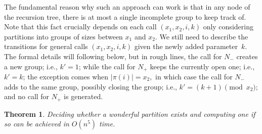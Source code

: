 \documentclass[a4paper]{article}
\newcommand{\modulus}[1]{\vert #1 \vert}
\newtheorem{theorem}{Theorem}\newtheorem{lemma}[theorem]{Lemma}\newtheorem{proposition}[theorem]{Proposition}\newtheorem{corollary}[theorem]{Corollary}\newtheorem{definition}[theorem]{Definition}
\begin{document}
The fundamental reason why such an approach can work is that in any node of the recursion tree, there is at most a single incomplete group to keep track of. Note that this fact crucially depends on each call $(x_1, x_2, i, k)$ only considering partitions into groups of sizes between $x_1$ and $x_2.$ We still need to describe the transitions for general calls $(x_1, x_2, i, k)$ given the newly added parameter~$k$. The formal details will following below, but in rough lines, the call for $N_{-}$ creates a new group; i.e., $k' = 1$; while the call for $N_{+}$ keeps the currently open one; i.e., $k' = k$; the exception comes when $\modulus{\pi(i)} = x_2,$ in which case the call for $N_{-}$ adds to the same group, possibly closing the group; i.e., $k' = (k + 1) \pmod{x_2}$; and no call for $N_{+}$ is generated.

\begin{theorem}  \label{thm:hiking-is-poly-time} Deciding whether a wonderful partition exists and computing one if so can be achieved in $O(n^5)$ time.
\end{theorem}
\end{document}
